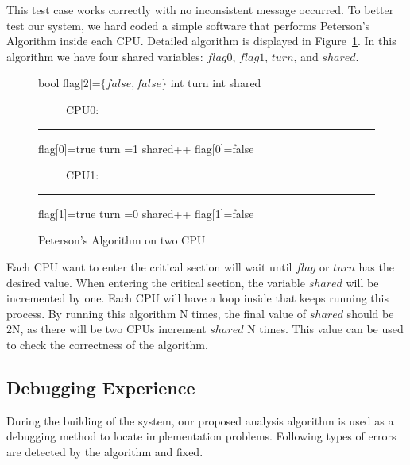 \documentclass[12pt,frontmatter,copyright,thesis]{usfmanus}
\let\oldnl\nl%
\newcommand{\nonl}{\renewcommand{\nl}{\let\nl\oldnl}}%
\newcommand{\rememberlines}{\xdef\rememberedlines{\number\value{AlgoLine}}}
\newcommand{\resumenumbering}{\setcounter{AlgoLine}{\rememberedlines}}
\begin{document}
This test case works correctly with no inconsistent message occurred. To better 
test our system, we hard coded a simple software that performs Peterson's Algorithm
inside each CPU. Detailed algorithm is displayed in Figure~\ref{petersons}. 
In this algorithm we have four shared variables: $flag0$, $flag1$, $turn$, and $shared$.
\begin{figure}[h]
\begin{algorithm}[H]
\DontPrintSemicolon
bool flag[2]=$\{false,false\}$\;
int turn\;
int shared\;
\rememberlines
\end{algorithm}

\begin{minipage}{.5\textwidth}
\begin{algorithm}[H]
\resumenumbering
\DontPrintSemicolon
\nonl \ \ \ \ \ CPU0:\;
\hrule
flag[0]=true\;
turn =1 \;
shared++\;
flag[0]=false\;
\end{algorithm}
\end{minipage}%
{\LinesNumberedHidden
\begin{minipage}{0.5\textwidth}
\begin{algorithm}[H]
\DontPrintSemicolon
\ \ \ \ \ CPU1:\;
\hrule
flag[1]=true\;
turn =0 \;
shared++\;
flag[1]=false\;
\end{algorithm}

\end{minipage}
}
\label{petersons}
\caption{Peterson's Algorithm on two CPU}
\end{figure}

Each CPU want to enter the critical section will wait until $flag$ or $turn$ has 
the desired value. When entering the critical section, the variable $shared$ will
be incremented by one.
Each CPU will have a loop inside that keeps running this process.
By running this algorithm N times, the final value of $shared$ should
be 2N, as there will be two CPUs increment $shared$ N times. This
value can be used to check the correctness of the algorithm.
\clearpage
\subsection{Debugging Experience}
During the building of the system, our proposed analysis algorithm
is used as a debugging method to locate implementation problems. Following types of errors
are detected by the algorithm and fixed.
\end{document}
